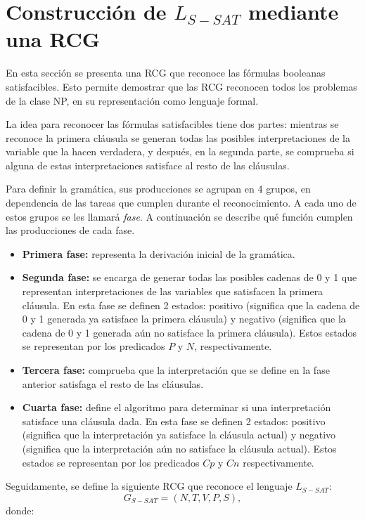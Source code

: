 \documentclass[12pt]{article}
\begin{document}
\section{Construcción de $L_{S-SAT}$ mediante una RCG}

En esta sección se presenta una RCG que reconoce las fórmulas booleanas satisfacibles. Esto permite demostrar 
que las RCG reconocen todos los problemas de la clase NP, en su representación como lenguaje formal.

La idea para reconocer las fórmulas satisfacibles tiene dos partes: mientras se reconoce la primera cláusula se generan todas las posibles interpretaciones de la variable que la hacen verdadera, y después, en la segunda parte, se comprueba si alguna de estas interpretaciones satisface al resto de las cláusulas.

Para definir la gramática, sus producciones se agrupan en 4 grupos, en dependencia de las tareas que cumplen durante el reconocimiento. A cada uno de estos grupos se les llamará \textit{fase}. A continuación se describe qué función cumplen las producciones de cada fase.

\begin{itemize}
    \item \textbf{Primera fase:} representa la derivación inicial de la gramática.
    \item \textbf{Segunda fase:} se encarga de generar todas las posibles cadenas de 0 y 1 que representan interpretaciones de las variables que satisfacen la primera cláusula. En esta fase se definen 2 estados: positivo (significa que la cadena de 0 y 1 generada ya satisface la primera cláusula) y negativo (significa que la cadena de 0 y 1 generada aún no satisface la primera cláusula). Estos estados se representan por los predicados $P$ y $N$, respectivamente.
    \item \textbf{Tercera fase:} comprueba que la interpretación que se define en la fase anterior satisfaga el resto de las cláusulas.
    \item \textbf{Cuarta fase:} define el algoritmo para determinar si una interpretación satisface una cláusula dada. En esta fase se definen 2 estados: positivo (significa que la interpretación ya satisface la cláusula actual) y negativo (significa que la interpretación aún no satisface la cláusula actual). Estos estados se representan por los predicados $Cp$ y $Cn$ respectivamente.
\end{itemize}

Seguidamente, se define la siguiente RCG que reconoce el lenguaje $L_{S-SAT}$:
\[
    G_{S-SAT} = (N, T, V, P, S),
\]
donde:
\end{document}
